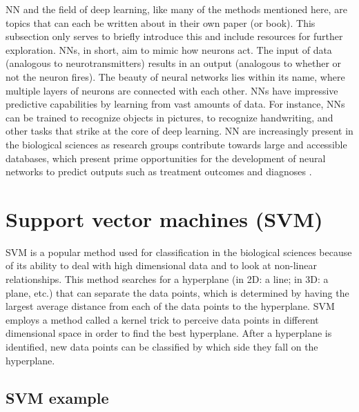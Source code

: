 \documentclass[12pt,openany]{book}
\begin{document}
NN and the field of deep learning, like many of the methods mentioned
here, are topics that can each be written about in their own paper (or
book). This subsection only serves to briefly introduce this and include
resources for further exploration. NNs, in short, aim to mimic how
neurons act. The input of data (analogous to neurotransmitters) results
in an output (analogous to whether or not the neuron fires). The beauty
of neural networks lies within its name, where multiple layers of
neurons are connected with each other. NNs have impressive predictive
capabilities by learning from vast amounts of data. For instance, NNs
can be trained to recognize objects in pictures, to recognize
handwriting, and other tasks that strike at the core of deep learning.
NN are increasingly present in the biological sciences as research
groups contribute towards large and accessible databases, which present
prime opportunities for the development of neural networks to predict
outputs such as treatment outcomes
\citep{snow1994artificial, kappen1993neural} and diagnoses
\citep{ercal1994neural, acharya2018deep, esteva2017dermatologist}.

\section{Support vector machines
(SVM)}\label{support-vector-machines-svm}

SVM is a popular method used for classification in the biological
sciences because of its ability to deal with high dimensional data and
to look at non-linear relationships. This method searches for a
hyperplane (in 2D: a line; in 3D: a plane, etc.) that can separate the
data points, which is determined by having the largest average distance
from each of the data points to the hyperplane. SVM employs a method
called a kernel trick to perceive data points in different dimensional
space in order to find the best hyperplane. After a hyperplane is
identified, new data points can be classified by which side they fall on
the hyperplane.

\subsection{SVM example}\label{svm-example}
\end{document}
